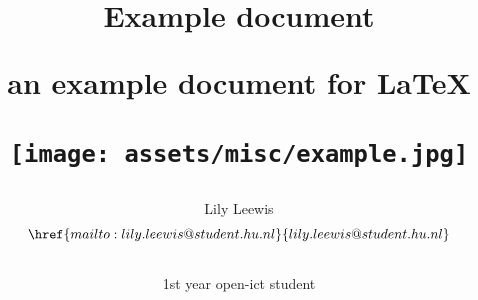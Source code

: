 \usepackage{parskip} %

\usepackage{float}
\usepackage[dvipsnames]{xcolor}
\usepackage{graphicx}

\usepackage{fancyhdr}
\usepackage{lastpage}
\usepackage{geometry}


\usepackage{bookmark}
\usepackage{tocbibind}

\usepackage{hyphsubst}
\usepackage[dutch]{babel}
\usepackage{listings}
\usepackage[
    citestyle=authoryear,
    backend=biber,
    style=ieee,
]{biblatex}
\usepackage[babel]{csquotes}
\usepackage{hyperref}


\pagestyle{fancy}
\setlength{\headheight}{2cm} %


\newcommand*{\fullref}[1]{\hyperref[{#1}]{\autoref*{#1} \nameref*{#1}}} %
\newcommand*{\partialref}[1]{\hyperref[{#1}]{\nameref*{#1}}}

\graphicspath{
	{./assets/}
}



\title{Example document\par an example document for \LaTeX \par \texttt{[image: assets/misc/example.jpg]}}
\author{
    Lily Leewis\\
    $$\href{mailto:lily.leewis@student.hu.nl}{lily.leewis@student.hu.nl}$$\\
    1st year open-ict student\\
    \newline
}

\fancyhf{}
\renewcommand{\headrulewidth}{2pt}
\renewcommand{\footrulewidth}{1pt}
